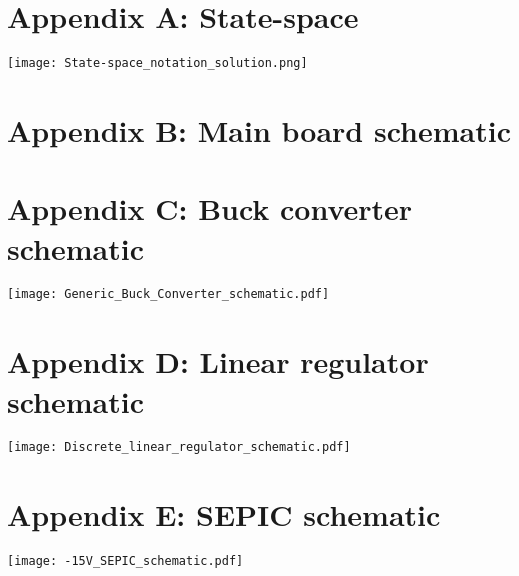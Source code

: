 \section*{Appendix A: State-space}


    \texttt{[image: State-space\_notation\_solution.png]}
\newpage
\newpage

\section*{Appendix B: Main board schematic}


\section*{Appendix C: Buck converter schematic}
\texttt{[image: Generic\_Buck\_Converter\_schematic.pdf]}

\section*{Appendix D: Linear regulator schematic}
\texttt{[image: Discrete\_linear\_regulator\_schematic.pdf]}

\section*{Appendix E: SEPIC schematic}
\texttt{[image: -15V\_SEPIC\_schematic.pdf]}